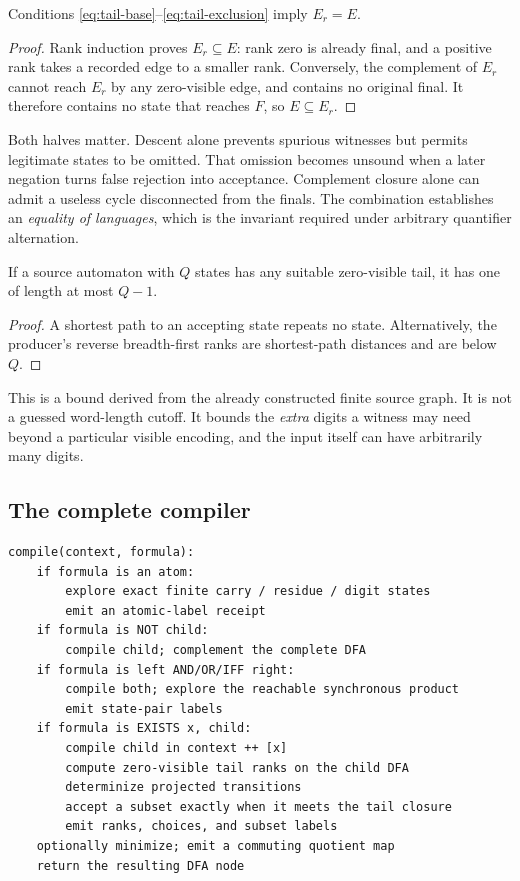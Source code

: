 \begin{lemma}\label{lem:tail}
Conditions \eqref{eq:tail-base}--\eqref{eq:tail-exclusion} imply \(E_r=E\).
\end{lemma}
\begin{proof}
Rank induction proves \(E_r\subseteq E\): rank zero is already final, and a positive rank takes a recorded edge to a smaller rank. Conversely, the complement of \(E_r\) cannot reach \(E_r\) by any zero-visible edge, and contains no original final. It therefore contains no state that reaches \(F\), so \(E\subseteq E_r\).
\end{proof}

Both halves matter. Descent alone prevents spurious witnesses but permits legitimate states to be omitted. That omission becomes unsound when a later negation turns false rejection into acceptance. Complement closure alone can admit a useless cycle disconnected from the finals. The combination establishes an \emph{equality of languages}, which is the invariant required under arbitrary quantifier alternation.

\begin{corollary}\label{cor:tail-bound}
If a source automaton with \(Q\) states has any suitable zero-visible tail, it has one of length at most \(Q-1\).
\end{corollary}
\begin{proof}
A shortest path to an accepting state repeats no state. Alternatively, the producer's reverse breadth-first ranks are shortest-path distances and are below \(Q\).
\end{proof}

This is a bound derived from the already constructed finite source graph. It is not a guessed word-length cutoff. It bounds the \emph{extra} digits a witness may need beyond a particular visible encoding, and the input itself can have arbitrarily many digits.

\subsection{The complete compiler}
\begin{lstlisting}
compile(context, formula):
    if formula is an atom:
        explore exact finite carry / residue / digit states
        emit an atomic-label receipt
    if formula is NOT child:
        compile child; complement the complete DFA
    if formula is left AND/OR/IFF right:
        compile both; explore the reachable synchronous product
        emit state-pair labels
    if formula is EXISTS x, child:
        compile child in context ++ [x]
        compute zero-visible tail ranks on the child DFA
        determinize projected transitions
        accept a subset exactly when it meets the tail closure
        emit ranks, choices, and subset labels
    optionally minimize; emit a commuting quotient map
    return the resulting DFA node
\end{lstlisting}

